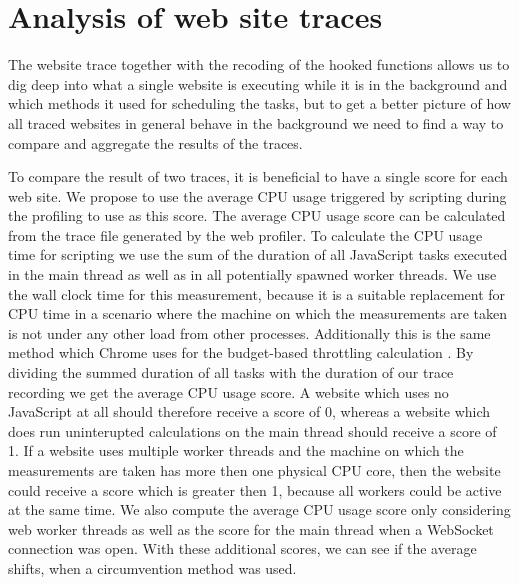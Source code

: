 \documentclass[
	ruledheaders=section,%
	class=report,%
	thesis={type=bachelor},%
	accentcolor=9c,%
	custommargins=true,%
	marginpar=false,%
	parskip=half-,%
	fontsize=11pt,%
]{tudapub}
\begin{document}
  \section{Analysis of web site traces}
  \label{sec:trace-analysis}

  The website trace together with the recoding of the hooked functions allows us to dig deep into what a single website is executing while it is in the background and which methods it used for scheduling the tasks, but to get a better picture of how all traced websites in general behave in the background we need to find a way to compare and aggregate the results of the traces. 

  To compare the result of two traces, it is beneficial to have a single score for each web site. We propose to use the average CPU usage triggered by scripting during the profiling to use as this score. The average CPU usage score can be calculated from the trace file generated by the web profiler. To calculate the CPU usage time for scripting we use the sum of the duration of all JavaScript tasks executed in the main thread as well as in all potentially spawned worker threads. We use the wall clock time for this measurement, because it is a suitable replacement for CPU time in a scenario where the machine on which the measurements are taken is not under any other load from other processes. Additionally this is the same method which Chrome uses for the budget-based throttling calculation \cite{chrome-background-tabs}. By dividing the summed duration of all tasks with the duration of our trace recording we get the average CPU usage score. A website which uses no JavaScript at all should therefore receive a score of 0, whereas a website which does run uninterupted calculations on the main thread should receive a score of 1. If a website uses multiple worker threads and the machine on which the measurements are taken has more then one physical CPU core, then the website could receive a score which is greater then 1, because all workers could be active at the same time. We also compute the average CPU usage score only considering web worker threads as well as the score for the main thread when a WebSocket connection was open. With these additional scores, we can see if the average shifts, when a circumvention method was used.
\end{document}
